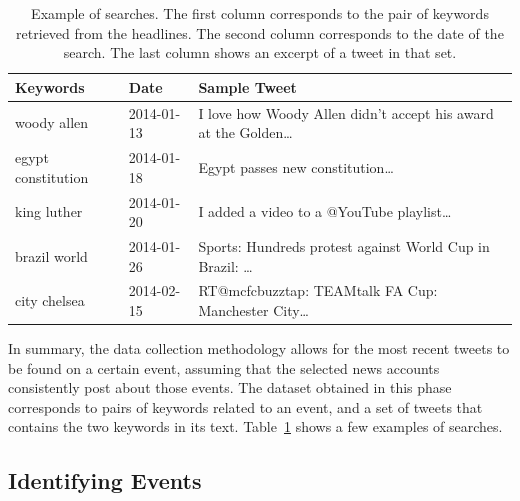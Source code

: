 \begin{table}
{\small
\begin{center}
\begin{tabular}{lll}
\toprule
 Keywords            &  Date       &  Sample Tweet                                                                                                                                                                                                                     \\
\midrule
 woody allen         &  2014-01-13  &  I love how Woody Allen didn't
 accept his award at the Golden\ldots{} \\
 egypt constitution  &  2014-01-18  &  Egypt passes new constitution\ldots{} \\
 king luther         &  2014-01-20  &  I added a video to a @YouTube
 playlist\ldots{} \\
 brazil world        &  2014-01-26  &  Sports: Hundreds protest against
 World Cup in Brazil: \ldots{} \\
 city chelsea        &  2014-02-15  &  RT@mcfcbuzztap: TEAMtalk FA Cup:
 Manchester City\ldots{} \\
 \bottomrule
\end{tabular}
\end{center}
} \caption[Example of searches.]{Example of searches. The first column
corresponds to the pair of keywords retrieved from the headlines. The second
column corresponds to the date of the search. The last column shows an excerpt
of a tweet in that set.}\label{table:searches}
\end{table}

In summary, the data collection methodology allows for the most recent tweets to
be found on a certain event, assuming that the selected news accounts
consistently post about those events. 
%
The dataset obtained in this phase corresponds to pairs of keywords related to
an event, and a set of tweets that contains the two keywords in its text.
%
Table~\ref{table:searches} shows a few examples of searches.


\subsection{Identifying Events}

